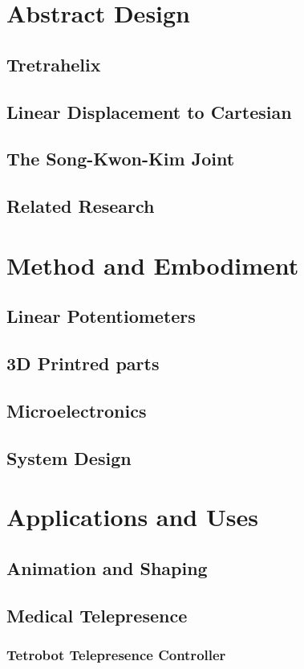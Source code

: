 \documentclass[11pt]{article}
\begin{document}
\section{Abstract Design}
\subsection{Tretrahelix}
\subsection{Linear Displacement to Cartesian}
\subsection{The Song-Kwon-Kim Joint}
\subsection{Related Research}

\section{Method and Embodiment}
\subsection{Linear Potentiometers}
\subsection{3D Printred parts}
\subsection{Microelectronics}
\subsection{System Design}

\section{Applications and Uses}
\subsection{Animation and Shaping}
\subsection{Medical Telepresence}
\subsubsection{Tetrobot Telepresence Controller }
\end{document}
